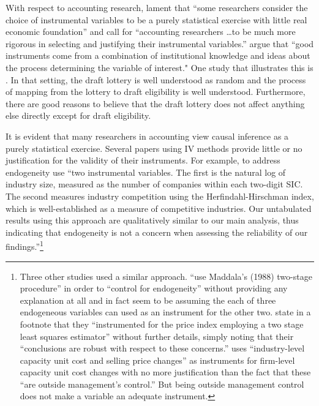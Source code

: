 \documentclass[11pt,reqno]{amsart}
\begin{document}
\begin{doublespace}
With respect to accounting research, \citet{Larcker:2010fq} lament that ``some researchers consider the choice of instrumental variables to be a purely statistical exercise with little real economic foundation'' and call for 
``accounting researchers \dots to be much more rigorous in selecting and justifying their instrumental variables.'' 
\citet[p.117]{Angrist:2008vk} argue that ``good instruments come from a combination of institutional knowledge and ideas about the process determining the variable of interest."
One study that illustrates this is \citet{Angrist:1990dk}.
In that setting, the draft lottery is well understood as random and the process of mapping from the lottery to draft eligibility is well understood.
Furthermore, there are good reasons to believe that the draft lottery does not affect anything else directly except for draft eligibility.%

It is evident that many researchers in accounting view causal inference as a purely statistical exercise.
Several papers using IV methods  provide little or no justification for the validity of their instruments.
For example, to address endogeneity \citet{Cohen:2014jl} use ``two instrumental variables. The first is the natural log of industry size, measured as the number of companies within each two-digit SIC. The second measures industry competition using the Herfindahl-Hirschman index, which is well-established as a measure of competitive industries. Our untabulated results using this approach are qualitatively similar to our main analysis, thus indicating that endogeneity is not a concern when assessing the reliability of our findings.''\footnote{
Three other studies used a similar approach.
 \citet{Vermeer:2014bs} ``use Maddala's (1988) two-stage procedure'' in order to ``control for endogeneity'' without providing any explanation at all and in fact seem to be assuming the each of three endogeneous variables can used as an instrument for the other two.
\citet[p.48]{Fox:2014io} state in a footnote that they ``instrumented for the price index employing a two stage least squares estimator'' without further details, simply noting that their ``conclusions are robust with respect to these concerns.''
\citet{Cannon:2014im} uses ``industry-level capacity unit cost and selling price changes'' as instruments for firm-level capacity unit cost changes with no more justification than the fact that these ``are outside management's control.'' But being outside management control does not make a variable an adequate instrument.}


\end{doublespace}
\end{document}
